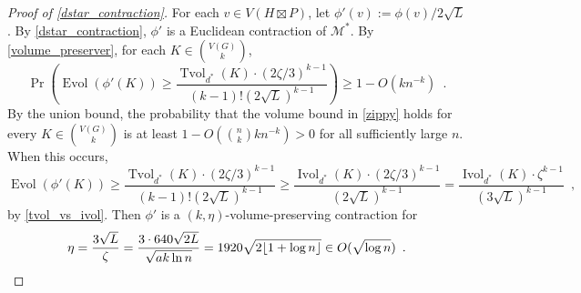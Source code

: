 \documentclass{patmorin}
\renewcommand{\ge}{\geqslant}
\renewcommand{\le}{\leqslant}
\DeclareMathOperator{\bw}{bw}
\DeclareMathOperator{\evol}{Evol}
\DeclareMathOperator{\ivol}{Ivol}
\DeclareMathOperator{\tvol}{Tvol}
\begin{document}
\begin{proof}[Proof of \cref{dstar_contraction}]
  For each $v\in V(H\boxtimes P)$, let $\phi'(v):=\phi(v)/2\sqrt{L}$. By \cref{dstar_contraction}, $\phi'$ is a Euclidean contraction of $\mathcal{M}^*$.  By \cref{volume_preserver}, for each $K\in \binom{V(G)}{k}$,
  \begin{equation}
    \Pr\left(\evol(\phi'(K)) \ge \frac{\tvol_{d^*}(K)\cdot(2\zeta/3)^{k-1}}{(k-1)!(2\sqrt{L})^{k-1}}\right) \ge 1- O(kn^{-k}) \enspace .
    \label{zippy}
  \end{equation}
  By the union bound, the probability that the volume bound in \cref{zippy} holds for every $K\in\binom{V(G)}{k}$ is at least $1-O(\binom{n}{k}kn^{-k}) > 0$ for all sufficiently large $n$.  When this occurs,
  \[
    \evol(\phi'(K)) \ge \frac{\tvol_{d^*}(K)\cdot(2\zeta/3)^{k-1}}{(k-1)!(2\sqrt{L})^{k-1}} \ge
    \frac{\ivol_{d^*}(K)\cdot(2\zeta/3)^{k-1}}{(2\sqrt{L})^{k-1}}
    =
    \frac{\ivol_{d^*}(K)\cdot\zeta^{k-1}}{(3\sqrt{L})^{k-1}}
    \enspace ,
  \]
  by \cref{tvol_vs_ivol}.  Then $\phi'$ is a $(k,\eta)$-volume-preserving contraction for
  \[
    \eta = \frac{3\sqrt{L}}{\zeta} = \frac{3\cdot 640\sqrt{2L}}{\sqrt{ak\ln n}} = {1920\sqrt{2{\lfloor 1+\log n \rfloor}}} \in 
    O(\sqrt{\log n}) \enspace . \qedhere
  \]
\end{proof}


\end{document}
